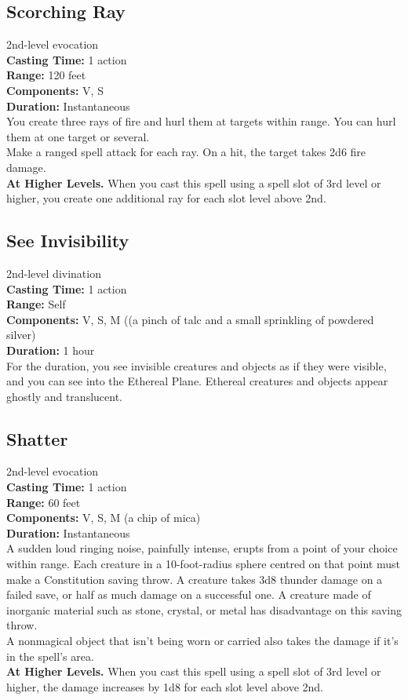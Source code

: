 \documentclass[11pt, A4paper, english]{article}
\begin{document}
		\subsection{Scorching Ray}
2nd-level evocation \\
\textbf{Casting Time:} 1 action \\
\textbf{Range:} 120 feet \\
\textbf{Components:} V, S \\
\textbf{Duration:} Instantaneous \\
You create three rays of fire and hurl them at targets within range. You can hurl them at one target or several. \\
Make a ranged spell attack for each ray. On a hit, the target takes 2d6 fire damage. \\
\textbf{At Higher Levels.} When you cast this spell using a spell slot of 3rd level or higher, you create one additional ray for each slot level above 2nd.

		\subsection{See Invisibility}
2nd-level divination \\
\textbf{Casting Time:} 1 action \\
\textbf{Range:} Self \\
\textbf{Components:} V, S, M ((a pinch of talc and a small sprinkling of powdered silver) \\
\textbf{Duration:} 1 hour \\
For the duration, you see invisible creatures and objects as if they were visible, and you can see into the Ethereal Plane. Ethereal creatures and objects appear ghostly and translucent.

		\subsection{Shatter}
2nd-level evocation \\
\textbf{Casting Time:} 1 action \\
\textbf{Range:} 60 feet \\
\textbf{Components:} V, S, M (a chip of mica) \\
\textbf{Duration:} Instantaneous \\
A sudden loud ringing noise, painfully intense, erupts from a point of your choice within range. Each creature in a 10-foot-radius sphere centred on that point must make a Constitution saving throw. A creature takes 3d8 thunder damage on a failed save, or half as much damage on a successful one. A creature made of inorganic material such as stone, crystal, or metal has disadvantage on this saving throw. \\
A nonmagical object that isn't being worn or carried also takes the damage if it's in the spell's area. \\
\textbf{At Higher Levels.} When you cast this spell using a spell slot of 3rd level or higher, the damage increases by 1d8 for each slot level above 2nd.
\end{document}
